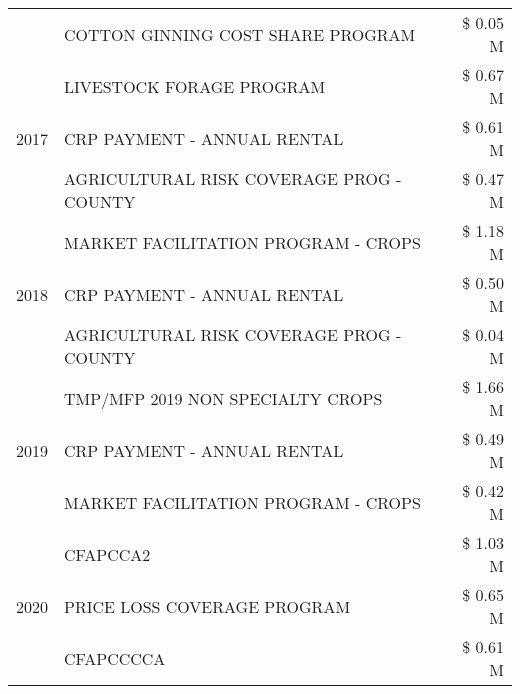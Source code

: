 \begin{tabular}{llr}
 & COTTON GINNING COST SHARE PROGRAM & \$ 0.05 M \\
\cline{1-3}
\multirow[t]{3}{*}{2017} & LIVESTOCK FORAGE PROGRAM & \$ 0.67 M \\
 & CRP PAYMENT - ANNUAL RENTAL & \$ 0.61 M \\
 & AGRICULTURAL RISK COVERAGE PROG - COUNTY & \$ 0.47 M \\
\cline{1-3}
\multirow[t]{3}{*}{2018} & MARKET FACILITATION PROGRAM - CROPS & \$ 1.18 M \\
 & CRP PAYMENT - ANNUAL RENTAL & \$ 0.50 M \\
 & AGRICULTURAL RISK COVERAGE PROG - COUNTY & \$ 0.04 M \\
\cline{1-3}
\multirow[t]{3}{*}{2019} & TMP/MFP 2019 NON SPECIALTY CROPS & \$ 1.66 M \\
 & CRP PAYMENT - ANNUAL RENTAL & \$ 0.49 M \\
 & MARKET FACILITATION PROGRAM - CROPS & \$ 0.42 M \\
\cline{1-3}
\multirow[t]{3}{*}{2020} & CFAPCCA2 & \$ 1.03 M \\
 & PRICE LOSS COVERAGE PROGRAM & \$ 0.65 M \\
 & CFAPCCCCA & \$ 0.61 M \\
\cline{1-3}
\bottomrule
\end{tabular}
